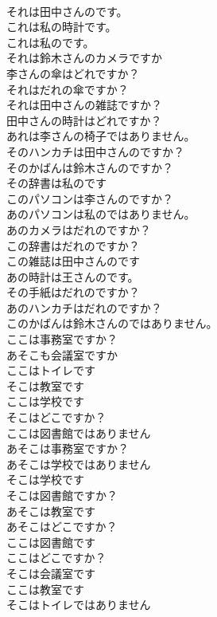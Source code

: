 \documentclass[8pt]{extreport}
\begin{document}
\begin{CJK}{UTF8}{min}
\\	それは田中さんのです。	
\\	これは私の時計です。	
\\	これは私のです。	
\\	それは鈴木さんのカメラですか	
\\	李さんの傘はどれですか？	
\\	それはだれの傘ですか？	
\\	それは田中さんの雑誌ですか？	
\\	田中さんの時計はどれですか？	
\\	あれは李さんの椅子ではありません。	
\\	そのハンカチは田中さんのですか？	
\\	そのかばんは鈴木さんのですか？	
\\	その辞書は私のです	
\\	このパソコンは李さんのですか？	
\\	あのパソコンは私のではありません。	
\\	あのカメラはだれのですか？	
\\	この辞書はだれのですか？	
\\	この雑誌は田中さんのです	
\\	あの時計は王さんのです。	
\\	その手紙はだれのですか？	
\\	あのハンカチはだれのですか？	
\\	このかばんは鈴木さんのではありません。	
\\	ここは事務室ですか？	
\\	あそこも会議室ですか	
\\	ここはトイレです	
\\	そこは教室です	
\\	ここは学校です	
\\	そこはどこですか？	
\\	ここは図書館ではありません	
\\	あそこは事務室ですか？	
\\	あそこは学校ではありません	
\\	そこは学校です	
\\	そこは図書館ですか？	
\\	あそこは教室です	
\\	あそこはどこですか？	
\\	ここは図書館です	
\\	ここはどこですか？	
\\	そこは会議室です	
\\	ここは教室です	
\\	そこはトイレではありません	

\end{CJK}
\end{document}
